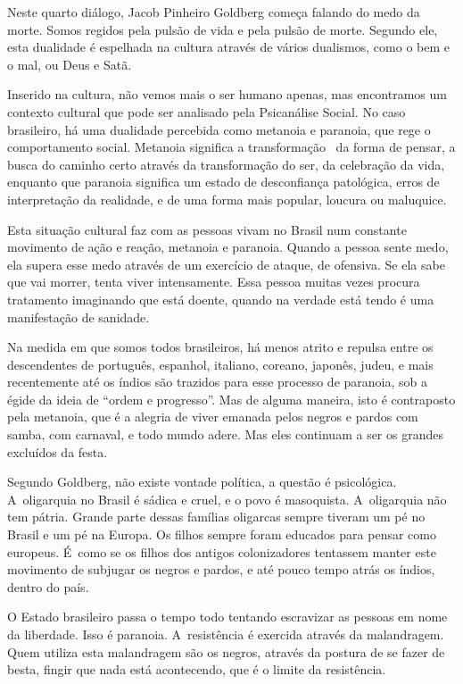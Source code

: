  

Neste quarto diálogo, Jacob Pinheiro Goldberg começa falando do medo da
morte. Somos regidos pela pulsão de vida e pela pulsão de morte. Segundo
ele, esta dualidade é espelhada na cultura através de vários dualismos,
como o bem e o mal, ou Deus e Satã.

Inserido na cultura, não vemos mais o ser humano apenas, mas encontramos
um contexto cultural que pode ser analisado pela Psicanálise Social. No
caso brasileiro, há uma dualidade percebida como metanoia e paranoia,
que rege o comportamento social. Metanoia significa a transformação~ da
forma de pensar, a busca do caminho certo através da transformação do
ser, da celebração da vida, enquanto que paranoia significa um estado de
desconfiança patológica, erros de interpretação da realidade, e de uma
forma mais popular, loucura ou maluquice.

Esta situação cultural faz com as pessoas vivam no Brasil num constante
movimento de ação e reação, metanoia e paranoia. Quando a pessoa sente
medo, ela supera esse medo através de um exercício de ataque, de
ofensiva. Se ela sabe que vai morrer, tenta viver intensamente. Essa
pessoa muitas vezes procura tratamento imaginando que está doente,
quando na verdade está tendo é uma manifestação de sanidade.

Na medida em que somos todos brasileiros, há menos atrito e repulsa
entre os descendentes de português, espanhol, italiano, coreano,
japonês, judeu, e mais recentemente até os índios são trazidos para esse
processo de paranoia, sob a égide da ideia de ``ordem e progresso''. Mas
de alguma maneira, isto é contraposto pela metanoia, que é a alegria de
viver emanada pelos negros e pardos com samba, com carnaval, e todo
mundo adere. Mas eles continuam a ser os grandes excluídos da festa.

Segundo Goldberg, não existe vontade política, a questão é psicológica.
A~oligarquia no Brasil é sádica e cruel, e o povo é masoquista. A~oligarquia não tem pátria. Grande parte dessas famílias oligarcas sempre
tiveram um pé no Brasil e um pé na Europa. Os filhos sempre foram
educados para pensar como europeus. É~como se os filhos dos antigos
colonizadores tentassem manter este movimento de subjugar os negros e
pardos, e até pouco tempo atrás os índios, dentro do país.

O Estado brasileiro passa o tempo todo tentando escravizar as pessoas em
nome da liberdade. Isso é paranoia. A~resistência é exercida através da
malandragem. Quem utiliza esta malandragem são os negros, através da
postura de se fazer de besta, fingir que nada está acontecendo, que é o
limite da resistência.

